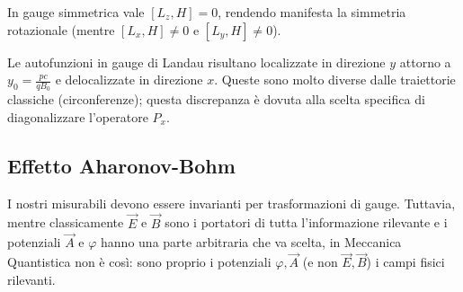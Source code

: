 \begin{remark}
    In gauge simmetrica vale \( [L_z, H] = 0 \), rendendo manifesta la simmetria rotazionale (mentre \( [L_x, H] \neq 0 \) e \( [L_y, H] \neq 0 \)).
\end{remark}

\begin{attention}
    Le autofunzioni in gauge di Landau risultano localizzate in direzione \( y \) attorno a \( y_0 = \frac{pc}{qB_0} \) e delocalizzate in direzione \( x \).
    Queste sono molto diverse dalle traiettorie classiche (circonferenze); questa discrepanza è dovuta alla scelta specifica di diagonalizzare l'operatore \( P_x \).
\end{attention}





\subsection{Effetto Aharonov-Bohm}

I nostri misurabili devono essere invarianti per trasformazioni di gauge.
Tuttavia, mentre classicamente \( \vec{E} \) e \( \vec{B} \) sono i portatori di tutta l'informazione rilevante 
e i potenziali \( \vec{A} \) e \( \varphi \) hanno una parte arbitraria che va scelta, in Meccanica Quantistica non è così: 
sono proprio i potenziali \( \varphi, \vec{A} \) (e non \( \vec{E}, \vec{B} \)) i campi fisici rilevanti.

